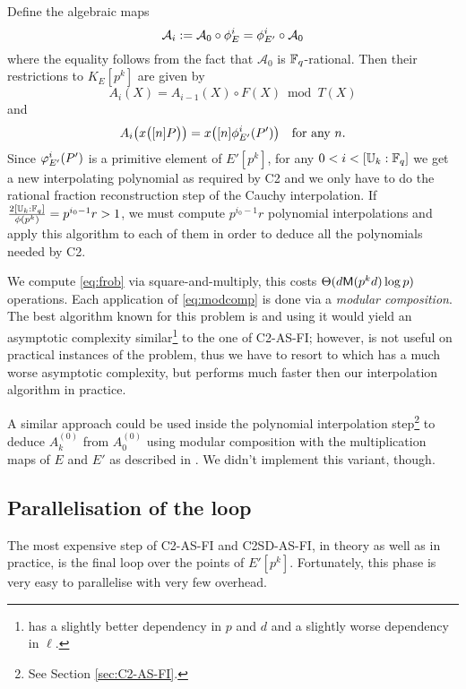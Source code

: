Define the algebraic maps
\begin{equation*}
  \mathcal{A}_i := \mathcal{A}_0\circ\phi_E^i = \phi_{E'}^i\circ\mathcal{A}_0
\end{equation*}
where the equality follows from the fact that $\mathcal{A}_0$ is
$\mathbb{F}_q$-rational. Then their restrictions to $K_E[p^k]$ are given by
\begin{equation}
  \label{eq:modcomp}
  A_i(X) = A_{i-1}(X)\circ F(X) \bmod T(X)
\end{equation}
and 
\begin{equation*}
  A_i\bigl(x\bigl([n]P\bigr)\bigr) = x\bigl([n]\phi_{E'}^i(P')\bigr)
  \quad\text{for any $n$.}
\end{equation*}
Since $\varphi_{E'}^i(P')$ is a primitive element of $E'[p^k]$, for any
$0 < i < [\mathbb{U}_k:\mathbb{F}_q]$ we get a new interpolating polynomial as
required by C2 and we only have to do the rational fraction
reconstruction step of the Cauchy interpolation. If
$\frac{2[\mathbb{U}_k:\mathbb{F}_q]}{\phi(p^k)} = p^{i_0-1}r > 1$, we must compute $p^{i_0-1}r$
polynomial interpolations and apply this algorithm to each of them in
order to deduce all the polynomials needed by C2.

We compute \eqref{eq:frob} via square-and-multiply, this costs
$\Theta(d\mathrm{\sf M}(p^kd)\log p)$ operations. Each application of
\eqref{eq:modcomp} is done via a \emph{modular composition}. The best
algorithm known for this problem is \cite{Uma09} and using it would
yield an asymptotic complexity similar\footnote{\cite{Uma09} has a
  slightly better dependency in $p$ and $d$ and a slightly worse
  dependency in $\ell$.} to the one of C2-AS-FI; however, \cite{Uma09}
is not useful on practical instances of the problem, thus we have to
resort to \cite{BrKu78} which has a much worse asymptotic complexity,
but performs much faster then our interpolation algorithm in practice.

A similar approach could be used inside the polynomial interpolation
step\footnote{See Section \ref{sec:C2-AS-FI}.} to deduce $A_k^{(0)}$
from $A_0^{(0)}$ using modular composition with the multiplication
maps of $E$ and $E'$ as described in \cite[$\S$2.3]{Cou96}. We didn't
implement this variant, though.


\subsection{Parallelisation of the loop}
\label{parallel}

The most expensive step of C2-AS-FI and C2SD-AS-FI, in theory as well
as in practice, is the final loop over the points of
$E'[p^k]$. Fortunately, this phase is very easy to parallelise with
very few overhead.

